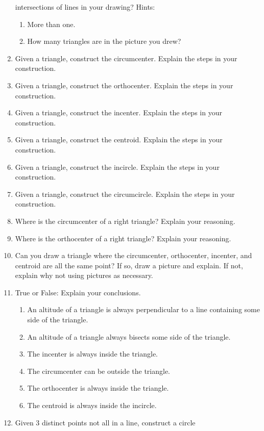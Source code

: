 \begin{enumerate}
  intersections of lines in your drawing? Hints:
\begin{enumerate}
\item More than one.
\item How many triangles are in the picture you drew?
\end{enumerate}
\item Given a triangle, construct the circumcenter. Explain the steps
  in your construction.
\item Given a triangle, construct the orthocenter. Explain the steps
  in your construction.
\item Given a triangle, construct the incenter. Explain the steps in
  your construction.
\item Given a triangle, construct the centroid. Explain the steps in
  your construction.
\item Given a triangle, construct the incircle. Explain the steps in
  your construction.
\item Given a triangle, construct the circumcircle. Explain the steps
  in your construction.
\item Where is the circumcenter of a right triangle? Explain your
  reasoning.
\item Where is the orthocenter of a right triangle? Explain your
  reasoning.
\item Can you draw a triangle where the circumcenter, orthocenter,
  incenter, and centroid are all the same point?  If so, draw a
  picture and explain. If not, explain why not using pictures as
  necessary.
\item True or False: Explain your conclusions.
\begin{enumerate}
\item An altitude of a triangle is always perpendicular to a line
  containing some side of the triangle.
\item An altitude of a triangle always bisects some side of the
  triangle.
\item The incenter is always inside the triangle.
\item The circumcenter can be outside the triangle.
\item The orthocenter is always inside the triangle.
\item The centroid is always inside the incircle.
\end{enumerate}
\item Given 3 distinct points not all in a line, construct a circle

\end{enumerate}
